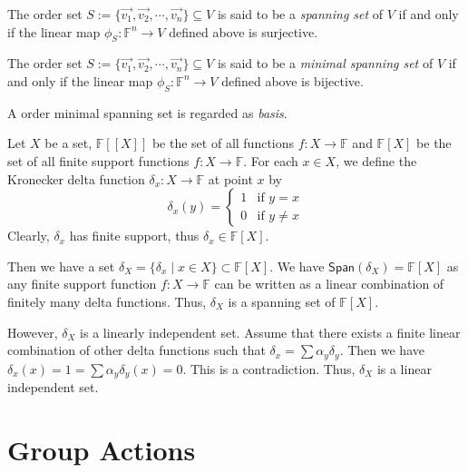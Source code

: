 \documentclass[
	11pt, %
	fleqn, %
	a4paper, %
]{LegrandOrangeBook}
\renewcommand{\span}[1]{\mathsf{Span}(#1)} %
\newcommand{\F}{\mathbb{F}} %
\begin{document}
\begin{proposition}
    The order set $S := \{\vec{v_1}, \vec{v_2}, \cdots, \vec{v_n}\} \subseteq V$ is said to be a \emph{spanning set} of $V$ if and only if the linear map $\phi_S: \F^n \to V$ defined above is surjective.
\end{proposition}

\begin{proposition} \label{prop:minimal_spanning_set}
    The order set $S := \{\vec{v_1}, \vec{v_2}, \cdots, \vec{v_n}\} \subseteq V$ is said to be a \emph{minimal spanning set} of $V$ if and only if the linear map $\phi_S: \F^n \to V$ defined above is bijective.
\end{proposition}

\begin{remark}
    A order minimal spanning set is regarded as \emph{basis}.
\end{remark}

\begin{example}
    Let $X$ be a set, $\F[[X]]$ be the set of all functions $f: X \to \F$ and $\F[X]$ be the set of all finite support functions $f: X \to \F$. For each $x \in X$, we define the Kronecker delta function $\delta_x : X \to \F$ at point $x$ by 
    \[
        \delta_x(y) = \begin{cases}
            1 & \text{if } y = x \\
            0 & \text{if } y \neq x
        \end{cases}
    \]
    Clearly, $\delta_x$ has finite support, thus $\delta_x \in \F[X]$.

    Then we have a set $\delta_X = \{\delta_x \mid x \in X\} \subset \F[X]$. We have $\span{\delta_X} = \F[X]$ as any finite support function $f: X \to \F$ can be written as a linear combination of finitely many delta functions. Thus, $\delta_X$ is a spanning set of $\F[X]$.

    However, $\delta_X$ is a linearly independent set. Assume that there exists a finite linear combination of other delta functions such that $\delta_x = \sum \alpha_y \delta_{y}$. Then we have $\delta_x(x) = 1 = \sum \alpha_y \delta_y(x) = 0$. This is a contradiction. Thus, $\delta_X$ is a linear independent set.
\end{example}

\newpage

\section{Group Actions}
\end{document}
